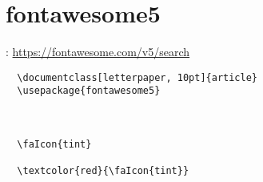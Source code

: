 

\section{fontawesome5 \textcolor{green}{} \textcolor{blue}{}  \textcolor{cyan}{} }
\www: \href{https://fontawesome.com/v5/search}{https://fontawesome.com/v5/search}

\begin{verbatim}
  \documentclass[letterpaper, 10pt]{article}
  \usepackage{fontawesome5}

  

  \faIcon{tint}

  \textcolor{red}{\faIcon{tint}}

  

\end{verbatim}


